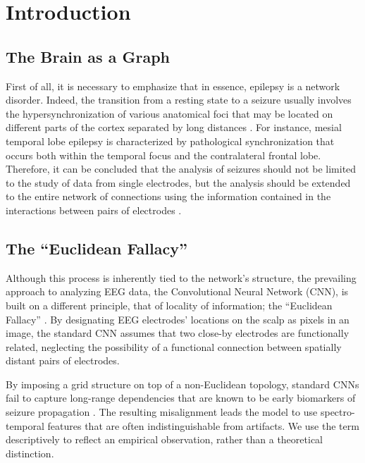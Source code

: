 \documentclass[journal]{IEEEtran}
\begin{document}
\section{Introduction}

\subsection{The Brain as a Graph}
First of all, it is necessary to emphasize that in essence, epilepsy is a network disorder. Indeed, the transition from a resting state to a seizure usually involves the hypersynchronization of various anatomical foci that may be located on different parts of the cortex separated by long distances \cite{bullmore}. For instance, mesial temporal lobe epilepsy is characterized by pathological synchronization that occurs both within the temporal focus and the contralateral frontal lobe. Therefore, it can be concluded that the analysis of seizures should not be limited to the study of data from single electrodes, but the analysis should be extended to the entire network of connections using the information contained in the interactions between pairs of electrodes \cite{stam}.

\subsection{The ``Euclidean Fallacy''}
Although this process is inherently tied to the network's structure, the prevailing approach to analyzing EEG data, the Convolutional Neural Network (CNN), is built on a different principle, that of locality of information; the ``Euclidean Fallacy'' \cite{bronstein}. By designating EEG electrodes' locations on the scalp as pixels in an image, the standard CNN assumes that two close-by electrodes are functionally related, neglecting the possibility of a functional connection between spatially distant pairs of electrodes. 

By imposing a grid structure on top of a non-Euclidean topology, standard CNNs fail to capture long-range dependencies that are known to be early biomarkers of seizure propagation \cite{friston}. The resulting misalignment leads the model to use spectro-\allowbreak temporal features that are often indistinguishable from artifacts. We use the term descriptively to reflect an empirical observation, rather than a theoretical distinction.
\end{document}
